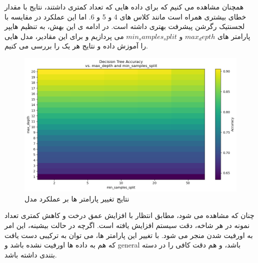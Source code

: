 \documentclass{article}
\begin{document}
\clearpage
همچنان مشاهده می کنیم که برای داده هایی که تعداد کمتری داشتند، نتایج با مقدار خطای بیشتری همراه است مانند کلاس های 4 و 5 و 6. اما این عملکرد در مقایسه با لجسنتیک رگرشن پیشرفت بهتری داشته است.
در ادامه ی این بهش، به تنظیم هایپر پارامتر های $max_depth$ و $min_samples_split$ می پردازیم و برای این مقادیر، مدل هایی را آموزش داده و نتایج هر یک را بررسی می کنیم.
\begin{figure}[h!]
	\centering
	\includegraphics[width=1\linewidth]{16}
	\caption[]{نتایج تغییر پارامتر ها بر عملکرد مدل}
	\label{fig:16}
\end{figure}
چنان که مشاهده می شود، مطابق انتظار با افزایش عمق درخت و کاهش کمتری تعداد نمونه در هر شاخه، دقت سیستم افزایش یافته است. اگرچه در حالت بیشینه، این امر به اورفیت شدن منجر می شود.
با تغییر این پارامتر ها، می توان به ترکیبی دست یافت که هم به داده ها اورفیت نشده باشد و general باشد، و هم دقت کافی را در دسته بتندی داشته باشد.
\clearpage
\end{document}

